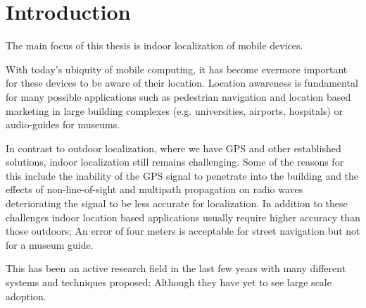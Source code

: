 
\chapter{Introduction} %

\label{Chapter1} %


\newcommand{\keyword}[1]{\textbf{#1}}
\newcommand{\tabhead}[1]{\textbf{#1}}
\newcommand{\code}[1]{\texttt{#1}}
\newcommand{\file}[1]{\texttt{\bfseries#1}}
\newcommand{\option}[1]{\texttt{\itshape#1}}


The main focus of this thesis is indoor localization of mobile devices.

With today's ubiquity of mobile computing, it has become evermore important for these devices to be aware of their location. Location awareness is fundamental for many possible applications such as pedestrian navigation and location based marketing in large building complexes (e.g. universities, airports, hospitals) or audio-guides for museums.

In contrast to outdoor localization, where we have GPS and other established solutions, indoor localization still remains challenging. Some of the reasons for this include the inability of the GPS signal to penetrate into the building and the effects of non-line-of-sight and multipath propagation on radio waves deteriorating the signal to be less accurate for localization\cite{JoseMaster,multipathEffects}. In addition to these challenges indoor location based applications usually require higher accuracy than those outdoors; An error of four meters is acceptable for street navigation but not for a museum guide.

This has been an active research field in the last few years with many different systems and techniques proposed; Although they have yet to see large scale adoption. 

